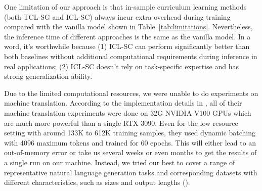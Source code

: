 One limitation of our approach is that in-sample curriculum learning methods (both TCL-SG and ICL-SC) always incur extra overhead during training compared with the vanilla model shown in Table~\ref{tab:limitations}. Nevertheless, the inference time of different approaches is the same as the vanilla model.
In a word, it's worthwhile because (1) ICL-SC can perform significantly better than both baselines without additional computational requirements during inference in real applications; (2) ICL-SC doesn't rely on task-specific expertise and has strong generalization ability.

Due to the limited computational resources, we were unable to do experiments on machine translation.
According to the implementation details in \citet{liang-etal-2021-token-wise}, all of their machine translation experiments were done on 32G NVIDIA V100 GPUs which are much more powerful than a single RTX 3090.
Even for the low resource setting with around 133K to 612K training samples, they used dynamic batching with 4096 maximum tokens and trained for 60 epochs.
This will either lead to an out-of-memory error or take us several weeks or even months to get the results of a single run on our machine.
Instead, we tried our best to cover a range of representative natural language generation tasks and corresponding datasets with different characteristics, such as sizes and output lengths ().
